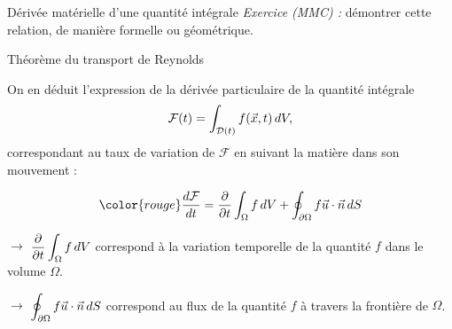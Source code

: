 {\begin{frame}{Dérivée matérielle d'une quantité intégrale}
%
%
%
%
%
%
%
%
%
\textcolor{vert}{\sl Exercice (MMC) :} démontrer cette relation, de manière formelle ou géométrique.

\vspace{0mm}

\end{frame}

\begin{frame}{Théorème du transport de Reynolds}

\small

On en déduit l'expression de la dérivée particulaire de la quantité intégrale 
\[
	\mathcal{F}(t) = \int_{{\cal D}(t)} f(\vec{x}, t)\, dV,
\]
correspondant au taux de variation de $\mathcal{F}$ en suivant la matière dans son mouvement :

\[
	\color{rouge}
	\ddt{\mathcal{F}} 
	= 
	\dpdt{} \int_\Omega f\, dV + \oint_{\partial\Omega} f\myvec{u}\cdot\myvec{n}\, dS
\]

$\longrightarrow$ $\displaystyle \frac{\partial }{\partial t} \int_\Omega f\, dV$ correspond à la variation temporelle de la quantité $f$
dans le volume $\Omega$.

\smallskip

$\longrightarrow$ $\displaystyle \oint_{\partial\Omega} f\vec{u}\cdot\vec{n}\, dS$ correspond au \textcolor{rouge}{flux}
de la quantité $f$ à travers la frontière de $\Omega$.


\end{frame}}
